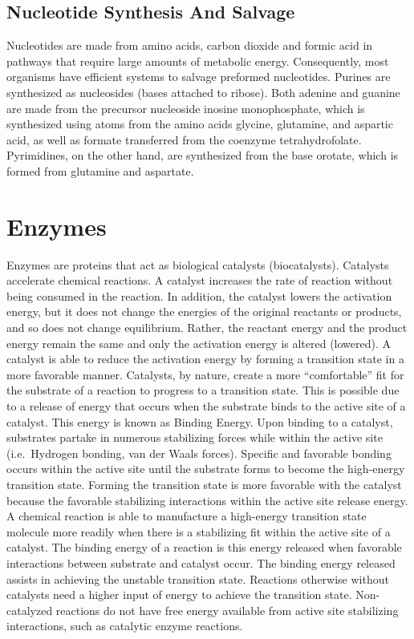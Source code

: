 \hypertarget{nucleotide-synthesis-and-salvage}{%
\subsection{Nucleotide Synthesis And Salvage}\label{nucleotide-synthesis-and-salvage}}

Nucleotides are made from amino acids, carbon dioxide and formic acid in pathways that require large amounts of metabolic energy. Consequently, most organisms have efficient systems to salvage preformed nucleotides. Purines are synthesized as nucleosides (bases attached to ribose). Both adenine and guanine are made from the precursor nucleoside inosine monophosphate, which is synthesized using atoms from the amino acids glycine, glutamine, and aspartic acid, as well as formate transferred from the coenzyme tetrahydrofolate. Pyrimidines, on the other hand, are synthesized from the base orotate, which is formed from glutamine and aspartate.

\hypertarget{enzymes}{%
\section{Enzymes}\label{enzymes}}

Enzymes are proteins that act as biological catalysts (biocatalysts). Catalysts accelerate chemical reactions. A catalyst increases the rate of reaction without being consumed in the reaction. In addition, the catalyst lowers the activation energy, but it does not change the energies of the original reactants or products, and so does not change equilibrium. Rather, the reactant energy and the product energy remain the same and only the activation energy is altered (lowered). A catalyst is able to reduce the activation energy by forming a transition state in a more favorable manner. Catalysts, by nature, create a more ``comfortable'' fit for the substrate of a reaction to progress to a transition state. This is possible due to a release of energy that occurs when the substrate binds to the active site of a catalyst. This energy is known as Binding Energy. Upon binding to a catalyst, substrates partake in numerous stabilizing forces while within the active site (i.e.~Hydrogen bonding, van der Waals forces). Specific and favorable bonding occurs within the active site until the substrate forms to become the high-energy transition state. Forming the transition state is more favorable with the catalyst because the favorable stabilizing interactions within the active site release energy. A chemical reaction is able to manufacture a high-energy transition state molecule more readily when there is a stabilizing fit within the active site of a catalyst. The binding energy of a reaction is this energy released when favorable interactions between substrate and catalyst occur. The binding energy released assists in achieving the unstable transition state. Reactions otherwise without catalysts need a higher input of energy to achieve the transition state. Non-catalyzed reactions do not have free energy available from active site stabilizing interactions, such as catalytic enzyme reactions.

